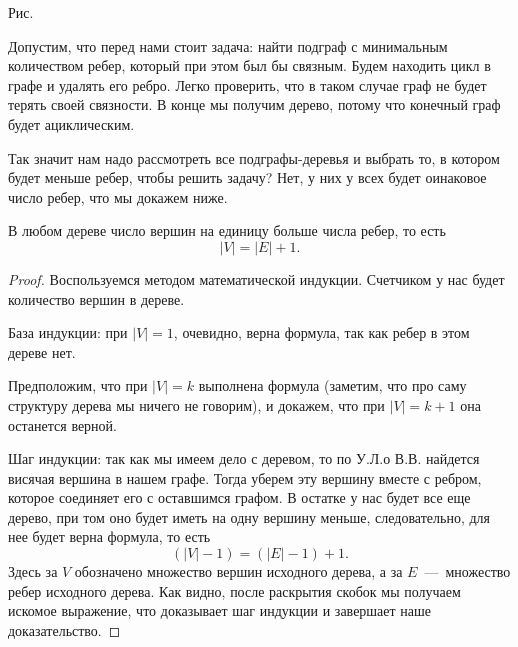 \begin{center}

	\small Рис. \images
\end{center}


	Допустим, что перед нами стоит задача: найти подграф с минимальным количеством ребер, который при этом был бы связным. Будем находить цикл в графе и удалять его ребро. Легко проверить, что в таком случае граф не будет терять своей связности. В конце мы получим дерево, потому что конечный граф будет ациклическим.
	
	Так значит нам надо рассмотреть все подграфы-деревья и выбрать то, в котором будет меньше ребер, чтобы решить задачу? Нет, у них у всех будет оинаковое число ребер, что мы докажем ниже.

\begin{statement}
	В любом дереве число вершин на единицу больше числа ребер, то есть $$|V| = |E| + 1.$$
	
\begin{proof}
	Воспользуемся методом математической индукции. Счетчиком у нас будет количество вершин в дереве.
	
	База индукции: при $|V| = 1$, очевидно, верна формула, так как ребер в этом дереве нет.
	
	Предположим, что при $|V| = k$ выполнена формула (заметим, что про саму структуру дерева мы ничего не говорим), и докажем, что при $|V| = k + 1$ она останется верной.
	
	Шаг индукции: так как мы имеем дело с деревом, то по У.Л.о В.В. найдется висячая вершина в нашем графе. Тогда уберем эту вершину вместе с ребром, которое соединяет его с оставшимся графом. В остатке у нас будет все еще дерево, при том оно будет иметь на одну вершину меньше, следовательно, для нее будет верна формула, то есть $$\left(|V| - 1\right) = \left(|E| - 1\right) + 1.$$
	Здесь за $V$ обозначено множество вершин исходного дерева, а за $E$~---~множество ребер исходного дерева. Как видно, после раскрытия скобок мы получаем искомое выражение, что доказывает шаг индукции и завершает наше доказательство.
\end{proof}
\end{statement}

